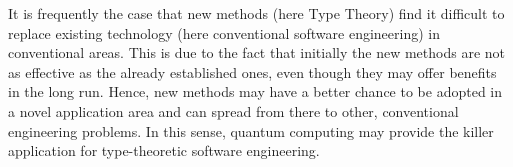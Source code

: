 \documentclass[a4paper]{article}
\begin{document}
It is frequently the case that new methods (here Type Theory) find it
difficult to replace existing technology (here conventional software
engineering) in conventional areas. This is due to the fact that
initially the new methods are not as effective as the already
established ones, even though they may offer benefits in the long
run. Hence, new methods may have a better chance to be adopted in a
novel application area and can spread from there to other, conventional
engineering problems. In this sense, quantum computing may provide the
killer application for type-theoretic software engineering.

\newpage

 
\end{document}
